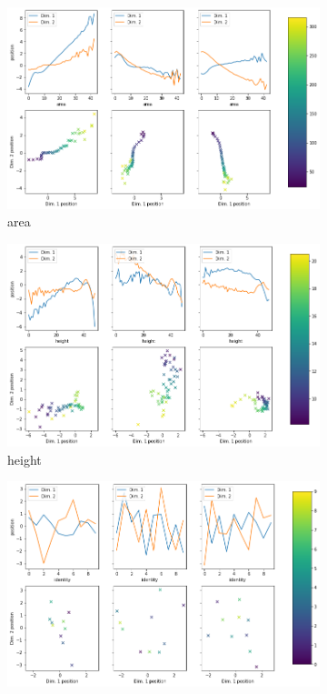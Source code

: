 \documentclass[11pt,a4paper]{article}
\begin{document}
\begin{figure}[H]
\centering
\begin{subfigure}{.48\textwidth}
\includegraphics[width=\textwidth]{images/latent_space_traversals/vlae_gan_mnist_morpho_latent_space_values_area.png}
\caption{area}
\end{subfigure}
\hfill
\begin{subfigure}{.48\textwidth}
\includegraphics[width=\textwidth]{images/latent_space_traversals/vlae_gan_mnist_morpho_latent_space_values_height.png}
\caption{height}
\end{subfigure}
\begin{subfigure}{.48\textwidth}
\includegraphics[width=\textwidth]{images/latent_space_traversals/vlae_gan_mnist_morpho_latent_space_values_identity.png}

\end{subfigure}
\end{figure}
\end{document}
